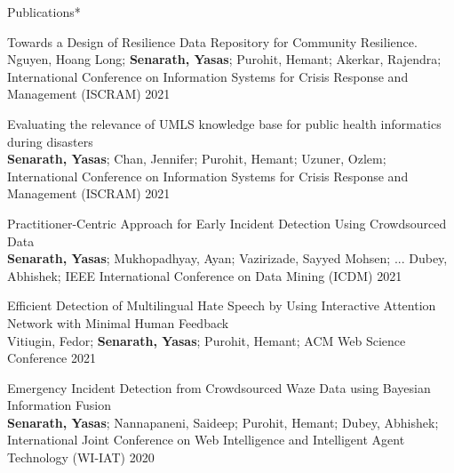 \documentclass{resume} %
\begin{document}
\begin{rSection}{Publications*}
    \vspace{-0.2in}

    \begin{rSubsection}{ Towards a Design of Resilience Data Repository for Community Resilience. }{\\ Nguyen, Hoang Long; \textbf{Senarath, Yasas}; Purohit, Hemant; Akerkar, Rajendra; }{International Conference on Information Systems for Crisis Response and Management (ISCRAM)}{ 2021 }
    \end{rSubsection}

    \begin{rSubsection}{ Evaluating the relevance of UMLS knowledge base for public health informatics during disasters }{\\ \textbf{Senarath, Yasas}; Chan, Jennifer; Purohit, Hemant; Uzuner, Ozlem; }{International Conference on Information Systems for Crisis Response and Management (ISCRAM)}{ 2021 }
    \end{rSubsection}

    \begin{rSubsection}{ Practitioner-Centric Approach for Early Incident Detection Using Crowdsourced Data }{\\ \textbf{Senarath, Yasas}; Mukhopadhyay, Ayan; Vazirizade, Sayyed Mohsen; ... Dubey, Abhishek; }{IEEE International Conference on Data Mining (ICDM)}{ 2021 }
    \end{rSubsection}


    \newpage

    \begin{rSubsection}{ Efficient Detection of Multilingual Hate Speech by Using Interactive Attention Network with Minimal Human Feedback }{\\ Vitiugin, Fedor; \textbf{Senarath, Yasas}; Purohit, Hemant; }{ACM Web Science Conference}{ 2021 }
    \end{rSubsection}

    \begin{rSubsection}{ Emergency Incident Detection from Crowdsourced Waze Data using Bayesian Information Fusion }{\\ \textbf{Senarath, Yasas}; Nannapaneni, Saideep; Purohit, Hemant; Dubey, Abhishek; }{International Joint Conference on Web Intelligence and Intelligent Agent Technology (WI-IAT)}{ 2020 }
    \end{rSubsection}


\end{rSection}
\end{document}
